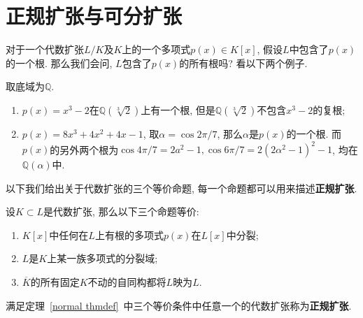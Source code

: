 \section{正规扩张与可分扩张}
对于一个代数扩张$L/K$及$K$上的一个多项式$p(x)\in K[x]$, 假设$L$中包含了$p(x)$的一个根.
那么我们会问, $L$包含了$p(x)$的所有根吗?
看以下两个例子.
\begin{eg}
    取底域为$\mathbb{Q}$.
    \begin{enumerate}[(1)]
        \item $p(x)=x^3-2$在$\mathbb{Q}(\sqrt[3]{2})$上有一个根, 但是$\mathbb{Q}(\sqrt[3]{2})$不包含$x^3-2$的复根;
        \item $p(x)=8x^3+4x^2+4x-1$, 取$\alpha=\cos{2\pi/7}$, 那么$\alpha$是$p(x)$的一个根.
        而$p(x)$的另外两个根为$\cos{4\pi/7}=2a^2-1,\cos{6\pi/7}=2(2\alpha^2-1)^2-1$, 均在$\mathbb{Q}(\alpha)$中.
    \end{enumerate}
\end{eg}

以下我们给出关于代数扩张的三个等价命题, 每一个命题都可以用来描述\textbf{正规扩张}.

\begin{thm}\label{normal thmdef}
    设$K\subset L$是代数扩张, 那么以下三个命题等价:
    \begin{enumerate}[(1)]
        \item $K[x]$中任何在$L$上有根的多项式$p(x)$在$L[x]$中分裂;
        \item $L$是$K$上某一族多项式的分裂域;
        \item $\overline{K}$的所有固定$K$不动的自同构都将$L$映为$L$.
    \end{enumerate}
\end{thm}

\begin{defn}
    满足定理~\ref{normal thmdef}~中三个等价条件中任意一个的代数扩张称为\textbf{正规扩张}.
\end{defn}

